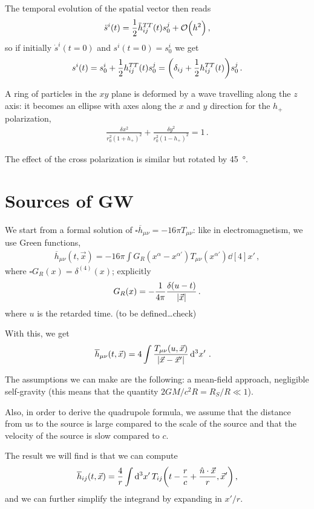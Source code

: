 \documentclass[main.tex]{subfiles}
\begin{document}
The temporal evolution of the spatial vector then reads 
%
\begin{align}
\ddot{s}^{i}(t) = \frac{1}{2} \ddot{h}^{TT}_{ij} (t) s_0^{j} + \order{h^2}
\,,
\end{align}
%
so if initially \(\dot{s}^{i} (t=0)\) and \(s^{i}(t=0) = s^{i}_0\) we get 
%
\begin{align}
s^{i}(t) = s^{i}_0 + \frac{1}{2} h^{TT}_{ij} (t) s^{j}_{0}
= \qty(\delta_{ij} + \frac{1}{2} h^{TT}_{ij}(t)) s^{j}_{0} 
\,.
\end{align}

A ring of particles in the \(xy\) plane is deformed by a wave travelling along the \(z\) axis: it becomes an ellipse with axes along the \(x\) and \(y\) direction for the \(h_+\) polarization, 
%
\begin{align}
\frac{ \delta x^2}{r_0^2 (1 + h_+)^2} +
\frac{ \delta y^2}{r_0^2 (1 - h_+)^2} = 1
\,.
\end{align}

The effect of the cross polarization is similar but rotated by \SI{45}{\degree}. 

\section{Sources of GW}

We start from a formal solution of \(\square \overline{h}_{\mu \nu }= - 16 \pi T_{\mu \nu }\): like in electromagnetism, we use Green functions, 
%
\begin{align}
\overline{h}_{\mu \nu } (t, \vec{x}) = - 16 \pi \int G_R (x^{\alpha } - x^{\alpha \prime}) T_{\mu \nu } (x^{\alpha \prime}) \dd[4]{x'} 
\,,
\end{align}
%
where \(\square G_R (x) = \delta^{(4)} (x)\); explicitly 
%
\begin{align}
G_R(x) = - \frac{1}{4 \pi } \frac{ \delta (u - t)}{\abs{\vec{x}}}
\,.
\end{align}
%
where \(u\) is the retarded time. (to be defined\dots check)

With this, we get 
%
\begin{align}
\overline{h}_{\mu \nu } (t, \vec{x}) &= 4 \int \frac{T_{\mu \nu } (u, \vec{x})}{\abs{\vec{x} - \vec{x}'}} \dd[3]{x'}
\,.
\end{align}

The assumptions we can make are the following: a mean-field approach, negligible self-gravity (this means that the quantity \(2GM / c^2R = R_S  / R \ll 1\)). 

Also, in order to derive the quadrupole formula, we assume that the distance from us to the source is large compared to the scale of the source and that the velocity of the source is slow compared to \(c\). 

The result we will find is that we can compute 
%
\begin{align}
\overline{h}_{ij} (t, \vec{x}) = \frac{4}{r} \int \dd[3]{x'} T_{ij} \qty(t - \frac{r}{c} + \frac{\hat{n} \cdot \vec{x}}{r} , \vec{x}')
\,,
\end{align}
%
and we can further simplify the integrand by expanding in \(x' / r\). 
\end{document}
